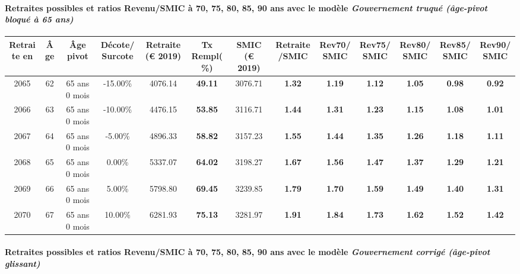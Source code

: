 \paragraph{Retraites possibles et ratios Revenu/SMIC à 70, 75, 80, 85, 90 ans avec le modèle \emph{Gouvernement truqué (âge-pivot bloqué à 65 ans)}}  
 
{ \scriptsize \begin{center} 
\begin{tabular}[htb]{|c|c||c|c||c|c||c||c|c|c|c|c|c|} 
\hline 
 Retraite en &  Âge &  Âge pivot &  Décote/Surcote &  Retraite (\euro{} 2019) &  Tx Rempl(\%) &  SMIC (\euro{} 2019) &  Retraite/SMIC &  Rev70/SMIC &  Rev75/SMIC &  Rev80/SMIC &  Rev85/SMIC &  Rev90/SMIC \\ 
\hline \hline 
 2065 &  62 &  65 ans 0 mois &  -15.00\% &  4076.14 &  {\bf 49.11} &  3076.71 &  {\bf 1.32} &  {\bf 1.19} &  {\bf 1.12} &  {\bf 1.05} &  {\bf {\color{red} 0.98}} &  {\bf {\color{red} 0.92}} \\ 
\hline 
 2066 &  63 &  65 ans 0 mois &  -10.00\% &  4476.15 &  {\bf 53.85} &  3116.71 &  {\bf 1.44} &  {\bf 1.31} &  {\bf 1.23} &  {\bf 1.15} &  {\bf 1.08} &  {\bf 1.01} \\ 
\hline 
 2067 &  64 &  65 ans 0 mois &  -5.00\% &  4896.33 &  {\bf 58.82} &  3157.23 &  {\bf 1.55} &  {\bf 1.44} &  {\bf 1.35} &  {\bf 1.26} &  {\bf 1.18} &  {\bf 1.11} \\ 
\hline 
 2068 &  65 &  65 ans 0 mois &  0.00\% &  5337.07 &  {\bf 64.02} &  3198.27 &  {\bf 1.67} &  {\bf 1.56} &  {\bf 1.47} &  {\bf 1.37} &  {\bf 1.29} &  {\bf 1.21} \\ 
\hline 
 2069 &  66 &  65 ans 0 mois &  5.00\% &  5798.80 &  {\bf 69.45} &  3239.85 &  {\bf 1.79} &  {\bf 1.70} &  {\bf 1.59} &  {\bf 1.49} &  {\bf 1.40} &  {\bf 1.31} \\ 
\hline 
 2070 &  67 &  65 ans 0 mois &  10.00\% &  6281.93 &  {\bf 75.13} &  3281.97 &  {\bf 1.91} &  {\bf 1.84} &  {\bf 1.73} &  {\bf 1.62} &  {\bf 1.52} &  {\bf 1.42} \\ 
\hline 
\hline 
\end{tabular} 
\end{center} } 
\paragraph{Retraites possibles et ratios Revenu/SMIC à 70, 75, 80, 85, 90 ans avec le modèle \emph{Gouvernement corrigé (âge-pivot glissant)}}  
 
